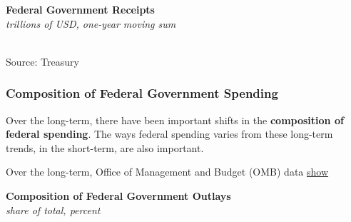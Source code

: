 \documentclass{report}
\makeatletter
\newcommand{\tbllink}[1]{\href{https://raw.githubusercontent.com/bdecon/US-chartbook/master/chartbook/data/#1}{\faTable}}
\newcommand*\short[1]{\expandafter\@gobbletwo\number\numexpr#1\relax}
\newcommand{\absnode}[3]{\node[below right, align=left] at (axis cs: #1,#2) {#3};}
\newcommand{\ltdateaxisticks}{
		date coordinates in=x, axis line style={draw=none},
		xmax={2023-02-15},
		max space between ticks=40,	    
		xtick={{2013-01-01}, {2014-01-01}, {2015-01-01}, {2016-01-01}, {2017-01-01}, {2018-01-01}, 
		    {2019-01-01}, {2020-01-01}, {2021-01-01}, {2022-01-01}, {2023-01-01}},
		enlarge y limits={0.06}, enlarge x limits={0.01},
		}
\newcommand{\bbar}[2]{extra #1 ticks = {{#2}}, extra #1 tick labels = ,
		extra #1 tick style = {grid=major, grid style={thick, black!25}},}
\newcommand{\stdline}[4]{\addplot[very thick, no markers, color=#1] 
		table [x=#2, y=#3, col sep=comma] {#4};	}
\newcommand{\rbar}{
		\fill[color=black!10] (axis cs:{2020-02-01},\pgfkeysvalueof{/pgfplots/ymin}) rectangle 
			(axis cs:{2020-05-01}, \pgfkeysvalueof{/pgfplots/ymax});}
\makeatother
\begin{document}
{\begin{minipage}{0.76\textwidth}
\small 
\end{minipage}  
\vspace{1mm}

\begin{minipage}{0.38\textwidth}
\normalsize \textbf{Federal Government Receipts}\\
\footnotesize{\textit{trillions of USD, one-year moving sum}}\\
\hspace*{-2mm} \\
\footnotesize{Source: Treasury} \hfill \tbllink{tmb_rec.csv}
\end{minipage}
\newpage
\begin{minipage}{0.76\textwidth}
\subsubsection*{Composition of Federal Government Spending}
\small Over the long-term, there have been important shifts in the \textbf{composition of federal spending}. The ways federal spending varies from these long-term trends, in the short-term, are also important. 

Over the long-term, Office of Management and Budget (OMB) data \href{https://www.whitehouse.gov/omb/historical-tables/}{show} 
\vspace{1mm}

\normalsize \textbf{Composition of Federal Government Outlays}\\
\footnotesize{\textit{share of total, percent}}
\vspace{1mm}


\end{minipage}}
\end{document}
